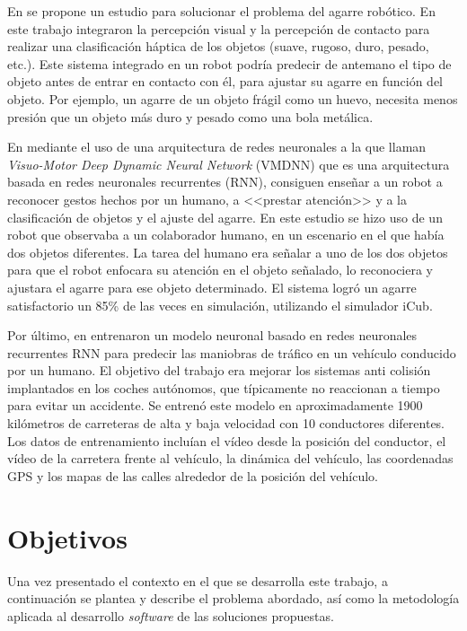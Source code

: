 En \cite{tactile} se propone un estudio para solucionar el problema del agarre robótico. En este trabajo integraron la percepción visual y la percepción de contacto para realizar una clasificación háptica de los objetos (suave, rugoso, duro, pesado, etc.). Este sistema integrado en un robot podría predecir de antemano el tipo de objeto antes de entrar en contacto con él, para ajustar su agarre en función del objeto. Por ejemplo, un agarre de un objeto frágil como un huevo, necesita menos presión que un objeto más duro y pesado como una bola metálica.

En \cite{synergy} mediante el uso de una arquitectura de redes neuronales a la que llaman \textit{Visuo-Motor Deep Dynamic Neural Network}  (VMDNN) que es una arquitectura basada en redes neuronales recurrentes (RNN), consiguen enseñar a un robot a reconocer gestos hechos por un humano, a <<prestar atención>> y a la clasificación de objetos y el ajuste del agarre. En este estudio se hizo uso de un robot que observaba a un colaborador humano, en un escenario en el que había dos objetos diferentes. La tarea del humano era señalar a uno de los dos objetos para que el robot enfocara su atención en el objeto señalado, lo reconociera y ajustara el agarre para ese objeto determinado. El sistema logró un agarre satisfactorio un 85\% de las veces en simulación, utilizando el simulador iCub.

Por último, en \cite{manuver} entrenaron un modelo neuronal basado en redes neuronales recurrentes RNN para predecir las maniobras de tráfico en un vehículo conducido por un humano. El objetivo del trabajo era mejorar los sistemas anti colisión implantados en los coches autónomos, que típicamente no reaccionan a tiempo para evitar un accidente. Se entrenó este modelo en aproximadamente 1900 kilómetros de carreteras de alta y baja velocidad con 10 conductores diferentes. Los datos de entrenamiento incluían el vídeo desde la posición del conductor, el vídeo de la carretera frente al vehículo, la dinámica del vehículo, las coordenadas GPS y los mapas de las calles alrededor de la posición del vehículo.

\section{Objetivos}

Una vez presentado el contexto en el que se desarrolla este trabajo, a continuación se plantea y describe el problema abordado, así como la metodología aplicada al desarrollo \textit{software} de las soluciones propuestas.

